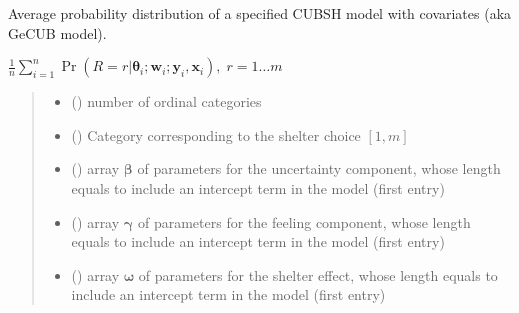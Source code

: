 \documentclass[letterpaper,10pt,english]{sphinxmanual}
\begin{document}
\begin{fulllineitems}
\label{\detokenize{cubmods:cubmods.cubsh_ywx.pmf}}
\pysigstartsignatures
{}
\pysigstopsignatures
\sphinxAtStartPar
Average probability distribution of a specified CUBSH model with covariates
(aka GeCUB model).

\sphinxAtStartPar
\(\frac{1}{n} \sum_{i=1}^n \Pr(R = r | \pmb\theta_i ; \pmb w_i; \pmb y_i, \pmb x_i),\; r=1 \ldots m\)
\begin{quote}\begin{description}
\begin{itemize}
\item {} 
\sphinxAtStartPar
{} () \textendash{} number of ordinal categories

\item {} 
\sphinxAtStartPar
{} () \textendash{} Category corresponding to the shelter choice \([1,m]\)

\item {} 
\sphinxAtStartPar
{} () \textendash{} array \(\pmb \beta\) of parameters for the uncertainty component, whose length equals 
 to include an intercept term in the model (first entry)

\item {} 
\sphinxAtStartPar
{} () \textendash{} array \(\pmb \gamma\) of parameters for the feeling component, whose length equals 
 to include an intercept term in the model (first entry)

\item {} 
\sphinxAtStartPar
{} () \textendash{} array \(\pmb \omega\) of parameters for the shelter effect, whose length equals 
 to include an intercept term in the model (first entry)


\end{itemize}
\end{description}
\end{quote}
\end{fulllineitems}
\end{document}
